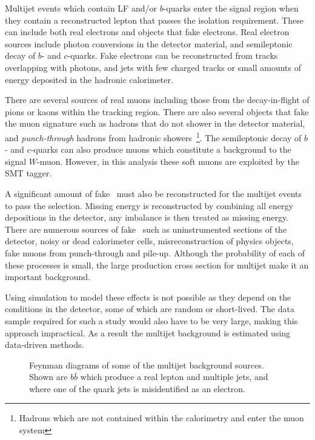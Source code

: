 Multijet events which contain LF and/or $b$-quarks enter the signal region when they contain a reconstructed lepton that passes the isolation requirement. These can include both real electrons and objects that fake electrons. Real electron sources include photon conversions in the detector material, and semileptonic decay of $b$- and $c$-quarks. Fake electrons can be reconstructed from tracks overlapping with photons, and jets with few charged tracks or small amounts of energy deposited in the hadronic calorimeter.

There are several sources of real muons including those from the decay-in-flight of pions or kaons within the tracking region. There are also several objects that fake the muon signature such as hadrons that do not shower in the detector material, and \emph{punch-through} hadrons from hadronic showers~\footnote{Hadrons which are not contained within the calorimetry and enter the muon system}. The semileptonic decay of $b$- and $c$-quarks can also produce muons which constitute a background to the signal $W$-muon. However, in this analysis these soft muons are exploited by the SMT tagger.

A significant amount of fake \met\ must also be reconstructed for the multijet events to pass the selection. Missing energy is reconstructed by combining all energy depositions in the detector, any imbalance is then treated as missing energy. There are numerous sources of fake \met\ such as uninstrumented sections of the detector, noisy or dead calorimeter cells, misreconstruction of physics objects, fake muons from punch-through and pile-up. Although the probability of each of these processes is small, the large production cross section for multijet make it an important background.

Using simulation to model these effects is not possible as they depend on the conditions in the detector, some of which are random or short-lived. The data sample required for such a study would also have to be very large, making this approach impractical. As a result the multijet background is estimated using data-driven methods.

\begin{figure}[htbp]
  \centering
    \begin{minipage}[][][t]{\textwidth}
      \centering
        
      \label{fig:MultiJetBkgReal}
    \end{minipage}
    
    \begin{minipage}[][][t]{\textwidth}
      \centering
        
      \label{fig:MultiJetBkgFake}
    \end{minipage}
    \caption[Feynman diagrams of some of the multijet background sources.]{Feynman diagrams of some of the multijet background sources. Shown are  $b\bar{b}$ which produce a real lepton and multiple jets, and  where one of the quark jets is misidentified as an electron.}
  \label{fig:MultiJetBkg}
\end{figure}

